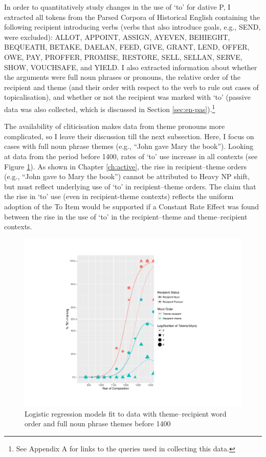 	In order to quantitatively study changes in the use of `to' for dative P, I extracted all tokens from the Parsed Corpora of Historical English \citep{Kroch.2000,Taylor.2003,Kroch.2004,Taylor.2006,Kroch.2010} containing the following recipient introducing verbs (verbs that also introduce goals, e.g., SEND, were excluded): ALLOT, APPOINT, ASSIGN, AYEVEN, BEHIEGHT, BEQUEATH, BETAKE, DAELAN, FEED, GIVE, GRANT, LEND, OFFER, OWE, PAY, PROFFER, PROMISE, RESTORE, SELL, SELLAN, SERVE, SHOW, VOUCHSAFE, and YIELD. I also extracted information about whether the arguments were full noun phrases or pronouns, the relative order of the recipient and theme (and their order with respect to the verb to rule out cases of topicalisation), and whether or not the recipient was marked with `to' (passive data was also collected, which is discussed in Section \ref{sec:en-pas}).\footnote{See Appendix A for links to the queries used in collecting this data.}

	The availability of cliticisation makes data from theme pronouns more complicated, so I leave their discussion till the next subsection. Here, I focus on cases with full noun phrase themes (e.g., ``John gave Mary the book''). Looking at data from the period before 1400, rates of `to' use increase in all contexts (see Figure \ref{fig:to-use-bf-1400}). As shown in Chapter \ref{ch:active}, the rise in recipient--theme orders (e.g., ``John gave to Mary the book'') cannot be attributed to Heavy NP shift, but must reflect underlying use of `to' in recipient--theme orders. The claim that the rise in `to' use (even in recipient-theme contexts) reflects the uniform adoption of the To Item would be supported if a Constant Rate Effect was found between the rise in the use of `to' in the recipient--theme and theme--recipient contexts.

	\begin{figure}[ht!]
		\includegraphics[width=\linewidth]{../images/to-use-bf-1400}
		\caption{Logistic regression models fit to data with theme--recipient word order and full noun phrase themes before 1400}
		\label{fig:to-use-bf-1400}
	\end{figure}

